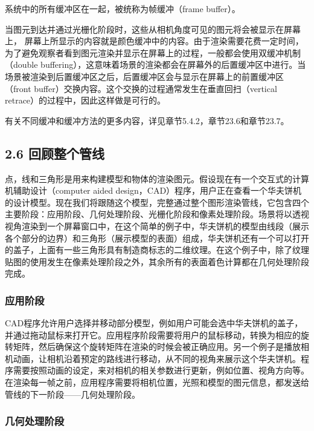 \documentclass[
  paper=a4,
  ,captions=tableheading
]{scrartcl}
\begin{document}
系统中的所有缓冲区在一起，被统称为帧缓冲（frame buffer）。

当图元到达并通过光栅化阶段时，这些从相机角度可见的图元将会被显示在屏幕上，
屏幕上所显示的内容就是颜色缓冲中的内容。由于渲染需要花费一定时间，为了避免观察者看到图元渲染并显示在屏幕上的过程，一般都会使用双缓冲机制（double
buffering），这意味着场景的渲染都会在屏幕外的后置缓冲区中进行。当场景被渲染到后置缓冲区之后，后置缓冲区会与显示在屏幕上的前置缓冲区（front
buffer）交换内容。这个交换的过程通常发生在垂直回扫（vertical
retrace）的过程中，因此这样做是可行的。

有关不同缓冲和缓冲方法的更多内容，详见章节5.4.2，章节23.6和章节23.7。

\subsection{2.6
回顾整个管线}\label{ux56deux987eux6574ux4e2aux7ba1ux7ebf}

点，线和三角形是用来构建模型和物体的渲染图元。假设现在有一个交互式的计算机辅助设计（computer
aided
design，CAD）程序，用户正在查看一个华夫饼机的设计模型。现在我们将跟随这个模型，完整通过整个图形渲染管线，它包含四个主要阶段：应用阶段、几何处理阶段、光栅化阶段和像素处理阶段。场景将以透视视角渲染到一个屏幕窗口中，在这个简单的例子中，华夫饼机的模型由线段（展示各个部分的边界）和三角形（展示模型的表面）组成，华夫饼机还有一个可以打开的盖子，上面有一些三角形具有制造商标志的二维纹理。在这个例子中，除了纹理贴图的使用发生在像素处理阶段之外，其余所有的表面着色计算都在几何处理阶段完成。

\subsubsection{应用阶段}\label{ux5e94ux7528ux9636ux6bb5-1}

CAD程序允许用户选择并移动部分模型，例如用户可能会选中华夫饼机的盖子，并通过拖动鼠标来打开它。应用程序阶段需要将用户的鼠标移动，转换为相应的旋转矩阵，然后确保这个旋转矩阵在渲染的时候会被正确应用。另一个例子是播放相机动画，让相机沿着预定的路线进行移动，从不同的视角来展示这个华夫饼机。程序需要按照动画的设定，来对相机的相关参数进行更新，例如位置、视角方向等。在渲染每一帧之前，应用程序需要将相机位置，光照和模型的图元信息，都发送给管线的下一阶段------几何处理阶段。

\subsubsection{几何处理阶段}\label{ux51e0ux4f55ux5904ux7406ux9636ux6bb5-1}
\end{document}

